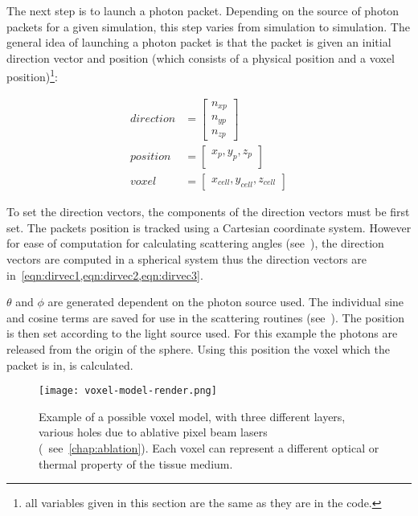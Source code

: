 The next step is to launch a photon packet. 
Depending on the source of photon packets for a given simulation, this step varies from simulation to simulation. 
The general idea of launching a photon packet is that the packet is given an initial direction vector and position (which consists of a physical position and a voxel position)\footnote{all variables given in this section are the same as they are in the code.}:

\begin{align}
	direction &= \begin{bmatrix}
		n_{xp}\\
		n_{yp}\\
		n_{zp}
	\end{bmatrix}\\
	position &= \begin{bmatrix}
		x_p, y_p, z_p\\
	\end{bmatrix}\\
	voxel &= \begin{bmatrix}
		x_{cell}, y_{cell}, z_{cell}
	\end{bmatrix}	 
\end{align}

To set the direction vectors, the components of the direction vectors must be first set. The packets position is tracked using a Cartesian coordinate system.
However for ease of computation for calculating scattering angles (see~), the direction vectors are computed in a spherical system thus the direction vectors are in~\cref{eqn:dirvec1,eqn:dirvec2,eqn:dirvec3}. 

$\theta$ and $\phi$ are generated dependent on the photon source used. The individual sine and cosine terms are saved for use in the scattering routines (see~).
The position is then set according to the light source used.
For this example the photons are released from the origin of the sphere.
Using this position the voxel which the packet is in, is calculated.
\FloatBarrier

\begin{figure}[!htbp]
\centering
\texttt{[image: voxel-model-render.png]}
\caption{Example of a possible voxel model, with three different layers, various holes due to ablative pixel beam lasers (~see~\cref{chap:ablation}). Each voxel can represent a different optical or thermal property of the tissue medium.}
\label{fig:voxel-model}
\vspace{-20pt}
\end{figure}
